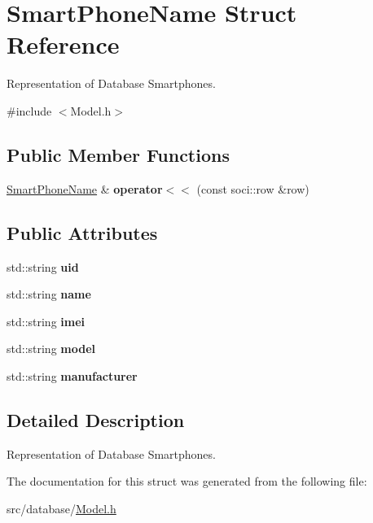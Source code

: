 \hypertarget{struct_smart_phone_name}{\section{Smart\-Phone\-Name Struct Reference}
\label{struct_smart_phone_name}
}


Representation of Database Smartphones.  




{\ttfamily \#include $<$Model.\-h$>$}

\subsection*{Public Member Functions}
\begin{DoxyCompactItemize}
\item 
\hypertarget{struct_smart_phone_name_a395cde9008f1d3ce8b650b30a602cfbd}{\hyperlink{struct_smart_phone_name}{Smart\-Phone\-Name} \& {\bfseries operator$<$$<$} (const soci\-::row \&row)}\label{struct_smart_phone_name_a395cde9008f1d3ce8b650b30a602cfbd}

\end{DoxyCompactItemize}
\subsection*{Public Attributes}
\begin{DoxyCompactItemize}
\item 
\hypertarget{struct_smart_phone_name_a52be5a1c841a0d4719a06f496a861ad9}{std\-::string {\bfseries uid}}\label{struct_smart_phone_name_a52be5a1c841a0d4719a06f496a861ad9}

\item 
\hypertarget{struct_smart_phone_name_a7ec00a7a4f303cfdc188e567cd588cd1}{std\-::string {\bfseries name}}\label{struct_smart_phone_name_a7ec00a7a4f303cfdc188e567cd588cd1}

\item 
\hypertarget{struct_smart_phone_name_afb6287c00f0ad05ed5c2ed2b15756756}{std\-::string {\bfseries imei}}\label{struct_smart_phone_name_afb6287c00f0ad05ed5c2ed2b15756756}

\item 
\hypertarget{struct_smart_phone_name_ac8a129a98bd8dd44dfbfe16285e2c321}{std\-::string {\bfseries model}}\label{struct_smart_phone_name_ac8a129a98bd8dd44dfbfe16285e2c321}

\item 
\hypertarget{struct_smart_phone_name_a6c1bdf8d3f0c2f817e4b99fa616f901b}{std\-::string {\bfseries manufacturer}}\label{struct_smart_phone_name_a6c1bdf8d3f0c2f817e4b99fa616f901b}

\end{DoxyCompactItemize}


\subsection{Detailed Description}
Representation of Database Smartphones. 

The documentation for this struct was generated from the following file\-:\begin{DoxyCompactItemize}
\item 
src/database/\hyperlink{_model_8h}{Model.\-h}\end{DoxyCompactItemize}
